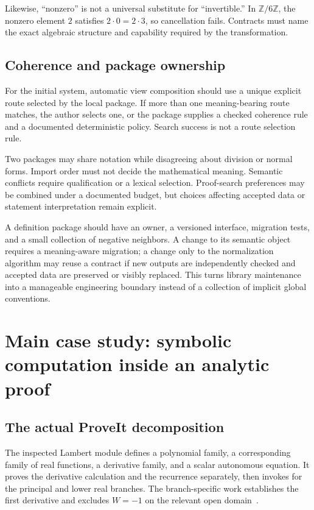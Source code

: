 \documentclass[11pt,a4paper]{article}
\newcommand{\code}[1]{\texttt{\detokenize{#1}}}
\newcommand{\Z}{\mathbb Z}
\theoremstyle{remark}
\begin{document}
Likewise, ``nonzero'' is not a universal substitute for ``invertible.'' In
$\Z/6\Z$, the nonzero element $2$ satisfies $2\cdot0=2\cdot3$, so cancellation
fails. Contracts must name the exact algebraic structure and capability required
by the transformation.

\subsection{Coherence and package ownership}
For the initial system, automatic view composition should use a unique explicit
route selected by the local package. If more than one meaning-bearing route
matches, the author selects one, or the package supplies a checked coherence
rule and a documented deterministic policy. Search success is not a route
selection rule.

Two packages may share notation while disagreeing about division or normal
forms. Import order must not decide the mathematical meaning. Semantic conflicts
require qualification or a lexical selection. Proof-search preferences may be
combined under a documented budget, but choices affecting accepted data or
statement interpretation remain explicit.

A definition package should have an owner, a versioned interface, migration tests,
and a small collection of negative neighbors. A change to its semantic object
requires a meaning-aware migration; a change only to the normalization algorithm
may reuse a contract if new outputs are independently checked and accepted data
are preserved or visibly replaced. This turns library maintenance into a
manageable engineering boundary instead of a collection of implicit global
conventions.

\section{Main case study: symbolic computation inside an analytic proof}
\label{sec:lambert}
\subsection{The actual ProveIt decomposition}
The inspected Lambert module defines a polynomial family, a corresponding family
of real functions, a derivative family, and a scalar autonomous equation. It
proves the derivative calculation and the recurrence separately, then invokes
\code{AutonomousODE.iteratedDeriv_eq_comp} for the principal and lower real
branches. The branch-specific work establishes the first derivative and excludes
$W=-1$ on the relevant open domain~\cite{plambert,pautonomous}.
\end{document}
